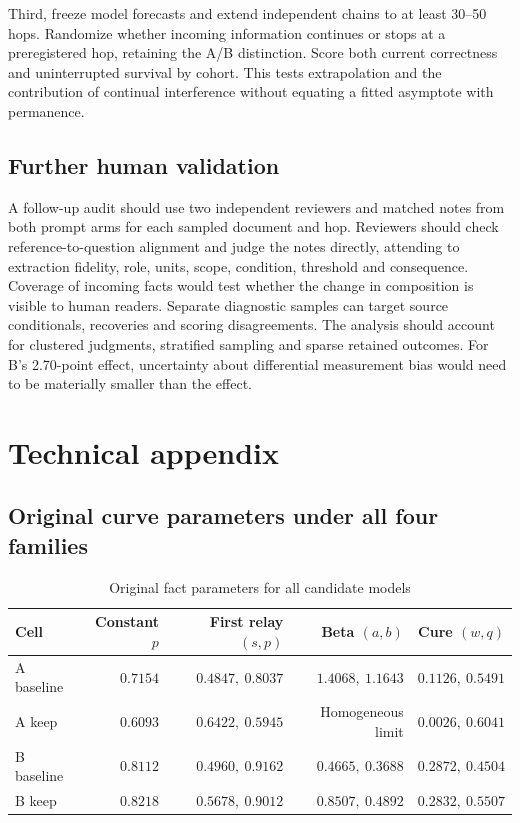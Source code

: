 \documentclass[10pt,letterpaper]{amsart}
\numberwithin{equation}{section}
\begin{document}
Third, freeze model forecasts and extend independent chains to at least 30--50 hops.
Randomize whether incoming information continues or stops at a preregistered hop,
retaining the A/B distinction. Score both current correctness and uninterrupted survival
by cohort. This tests extrapolation and the contribution of continual interference without
equating a fitted asymptote with permanence.

\subsection*{Further human validation}

A follow-up audit should use two independent reviewers and matched notes from both
prompt arms for each sampled document and hop. Reviewers should check reference-to-question
alignment and judge the notes directly, attending to extraction fidelity, role, units,
scope, condition, threshold and consequence. Coverage of incoming facts would test whether
the change in composition is visible to human readers. Separate diagnostic samples can
target source conditionals, recoveries and scoring disagreements. The analysis should
account for clustered judgments, stratified sampling and sparse retained outcomes. For B's
2.70-point effect, uncertainty about differential measurement bias would need to be
materially smaller than the effect.

\FloatBarrier
\appendix

\section{Technical appendix}

\subsection*{Original curve parameters under all four families}

\begin{table}[!htbp]
  \centering
  \small
  \caption{Original fact parameters for all candidate models}
  \label{tab:original-parameters}
  \begin{tabular}{@{}lrrrr@{}}
    \toprule
    \textbf{Cell} & \textbf{Constant $p$} & \textbf{First relay $(s,p)$} & \textbf{Beta $(a,b)$} & \textbf{Cure $(w,q)$} \\
    \midrule
    A baseline & $0.7154$ & $0.4847,\ 0.8037$ & $1.4068,\ 1.1643$ & $0.1126,\ 0.5491$ \\
    A keep & $0.6093$ & $0.6422,\ 0.5945$ & Homogeneous limit & $0.0026,\ 0.6041$ \\
    B baseline & $0.8112$ & $0.4960,\ 0.9162$ & $0.4665,\ 0.3688$ & $0.2872,\ 0.4504$ \\
    B keep & $0.8218$ & $0.5678,\ 0.9012$ & $0.8507,\ 0.4892$ & $0.2832,\ 0.5507$ \\
    \bottomrule
  \end{tabular}
\end{table}
\end{document}
